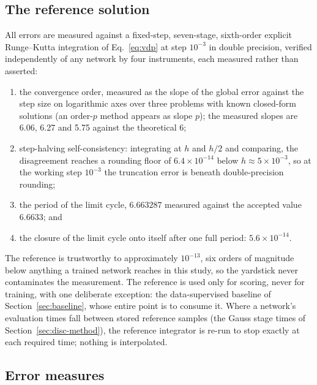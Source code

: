 \documentclass[11pt,a4paper]{article}
\begin{document}
\subsection{The reference solution}

All errors are measured against a fixed-step, seven-stage, sixth-order
explicit Runge--Kutta integration of Eq.~\eqref{eq:vdp} at step
$10^{-3}$ in double precision, verified independently of any network by
four instruments, each measured rather than asserted:
\begin{enumerate}
  \item the convergence order, measured as the slope of the global error
  against the step size on logarithmic axes over three problems with known
  closed-form solutions (an order-$p$ method appears as slope $p$); the
  measured slopes are 6.06, 6.27 and 5.75 against the theoretical 6;
  \item step-halving self-consistency: integrating at $h$ and $h/2$ and
  comparing, the disagreement reaches a rounding floor of
  $6.4\times10^{-14}$ below $h \approx 5\times10^{-3}$, so at the working
  step $10^{-3}$ the truncation error is beneath double-precision
  rounding;
  \item the period of the limit cycle, $6.663287$ measured against the
  accepted value $6.6633$; and
  \item the closure of the limit cycle onto itself after one full period:
  $5.6\times10^{-14}$.
\end{enumerate}
The reference is trustworthy to approximately $10^{-13}$, six orders of
magnitude below anything a trained network reaches in this study, so the
yardstick never contaminates the measurement. The reference is used only
for scoring, never for training, with one deliberate exception: the
data-supervised baseline of Section~\ref{sec:baseline}, whose entire point
is to consume it. Where a network's evaluation times fall between stored
reference samples (the Gauss stage times of
Section~\ref{sec:disc-method}), the reference integrator is re-run to stop
exactly at each required time; nothing is interpolated.

\subsection{Error measures}
\label{sec:metrics}
\end{document}
